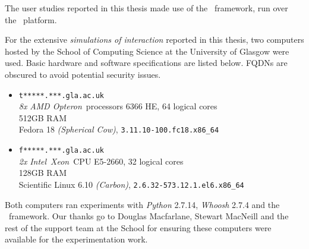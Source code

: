 
\begin{preamble}
{}

The user studies reported in this thesis made use of the \treconomics~framework, run over the~ platform.

For the extensive \emph{simulations of interaction} reported in this thesis, two computers hosted by the School of Computing Science at the University of Glasgow were used. Basic hardware and software specifications are listed below. FQDNs are obscured to avoid potential security issues.

\begin{itemize}
    
    \item{\texttt{t*****.***.gla.ac.uk}\\\emph{8x} \emph{AMD Opteron}\texttrademark~processors 6366 HE, 64 logical cores\\512GB RAM\\Fedora 18 \emph{(Spherical Cow)}, \texttt{3.11.10-100.fc18.x86\_64}}
    
    \item{\texttt{f*****.***.gla.ac.uk}\\\emph{2x} \emph{Intel}\textregistered~\emph{Xeon}\textregistered~CPU E5-2660, 32 logical cores\\128GB RAM\\Scientific Linux 6.10 \emph{(Carbon)}, \texttt{2.6.32-573.12.1.el6.x86\_64}}
    
\end{itemize}

Both computers ran experiments with \emph{Python} 2.7.14, \emph{Whoosh} 2.7.4 and the \simiir~framework. Our thanks go to Douglas Macfarlane, Stewart MacNeill and the rest of the support team at the School for ensuring these computers were available for the experimentation work.
\end{preamble}